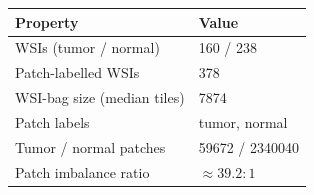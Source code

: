 \begin{tabular}{ll}
\toprule
Property & Value\\
\midrule
WSIs (tumor / normal) & \num{160} / \num{238}\\
Patch-labelled WSIs & \num{378}\\
WSI-bag size (median tiles) & \num{7874}\\
Patch labels & tumor, normal\\
Tumor / normal patches & \num{59672} / \num{2340040}\\
Patch imbalance ratio & ${\approx}\num{39.2}{:}1$\\
\bottomrule
\end{tabular}
